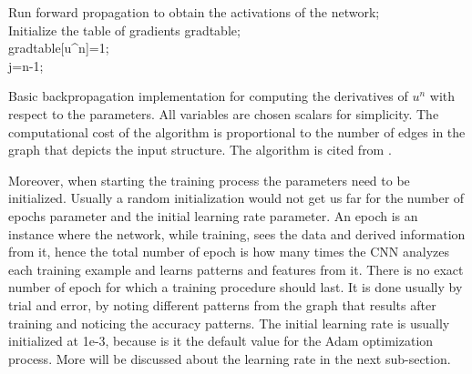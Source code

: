 \documentclass[12pt,a4paper,twoside]{report}
\begin{document}
\begin{algorithm}[h!]
\SetAlgoLined
{}
 Run forward propagation to obtain the activations of the network;\\
 Initialize the table of gradients gradtable;\\
 gradtable[u^{n}]=1;\\
 j=n-1;\\
 \caption{Basic backpropagation implementation for computing the derivatives of $u^{n}$ with respect to the parameters. All variables are chosen scalars for simplicity. The computational cost of the algorithm is proportional to the number of edges in the graph that depicts the input structure. The algorithm is cited from \cite{book-deeplearning}.}
 
\end{algorithm}

Moreover, when starting the training process the parameters need to be initialized. Usually a random initialization would not get us far for the number of epochs parameter and the initial learning rate parameter. An epoch is an instance where the network, while training, sees the data and derived information from it, hence the total number of epoch is how many times the CNN analyzes each training example and learns patterns and features from it. There is no exact number of epoch for which a training procedure should last. It is done usually by trial and error, by noting different patterns from the graph that results after training and noticing the accuracy patterns. The initial learning rate is usually initialized at 1e-3, because is it the default value for the Adam optimization process. More will be discussed about the learning rate in the next sub-section.\par
\end{document}
